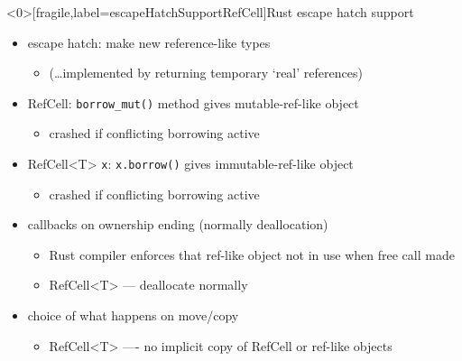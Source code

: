\begin{frame}<0>[fragile,label=escapeHatchSupportRefCell]{Rust escape hatch support}
    \begin{itemize}
        \item escape hatch: make new reference-like types
            \begin{itemize}
            \item (\ldots implemented by returning temporary `real' references)
            \end{itemize}
        \item<2> RefCell: \verb|borrow_mut()| method gives mutable-ref-like object
            \begin{itemize}
            \item crashed if conflicting borrowing active
            \end{itemize}
        \item<2> RefCell<T> \verb|x|: \verb|x.borrow()| gives immutable-ref-like object
            \begin{itemize}
            \item crashed if conflicting borrowing active
            \end{itemize}
        \item callbacks on ownership ending (normally deallocation)
            \begin{itemize}
            \item Rust compiler enforces that ref-like object not in use when free call made
            \item<2> RefCell<T> --- deallocate normally
            \end{itemize}
        \item choice of what happens on move/copy
            \begin{itemize}
            \item<2> RefCell<T> ---- no implicit copy of RefCell or ref-like objects
            \end{itemize}
    \end{itemize}
\end{frame}

